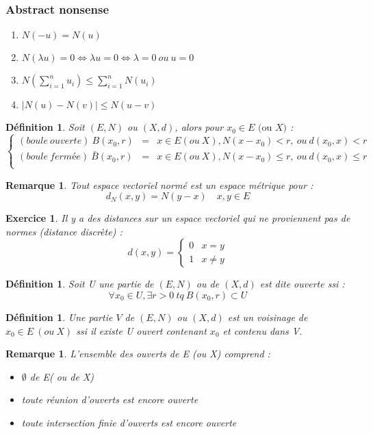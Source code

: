 \documentclass[a4paper, oneside]{report}
\theoremstyle{break}
\newtheorem{defi}[thm]{Définition}
\newtheorem{remar}[thm]{Remarque}
\newtheorem{exo}[thm]{Exercice}
\newcommand{\ev}{espace vectoriel }
\newcommand{\evn}{espace vectoriel normé }
\begin{document}
\subsubsection{Abstract nonsense}
\begin{enumerate}
\item $N(-u)=N(u)$
\item $N(\lambda u)=0 \Leftrightarrow \lambda u =0 \Leftrightarrow \lambda =0~ou~u=0$
\item $N(\sum_{i=1}^{n}u_i) \leq \sum_{i=1}^{n}N(u_i)$
\item $|N(u)-N(v)|\leq N(u-v)$
\end{enumerate}

\begin{defi}
Soit $(E,N)$ ou $(X,d)$, alors pour $x_0\in E \text{ (ou }X)$ :
$$\left\{\begin{array}{lll}
(boule~ouverte)~B(x_0,r)&=& x\in E(ou~X), N(x-x_0)<r,~ou~d(x_0,x)<r\\
(boule~fermée)~\bar{B}(x_0,r)&=&x\in E(ou~X), N(x-x_0)\leq r,~ou~d(x_0,x)\leq r\\
\end{array}\right.$$
\end{defi}

\begin{remar}
Tout \evn est un espace métrique pour :
$$d_N(x,y)=N(y-x)\hspace{1em}x,y\in E$$
\end{remar}

\begin{exo}
Il y a des distances sur un \ev qui ne proviennent pas de normes (distance discrète) :
$$d(x,y)=\left\{\begin{array}{ll}
0 & x=y\\
1 & x\neq y
\end{array}\right.$$
\end{exo}

\begin{defi}
Soit U une partie de $(E,N)$ ou de $(X, d)$ est dite ouverte ssi :
$$\forall x_0\in U, \exists r>0~tq~B(x_0,r)\subset U$$
\end{defi}

\begin{defi}        
Une partie $V$ de $(E,N)$ ou $(X, d)$ est un voisinage de $x_0\in E~(ou~X)$ ssi il existe U ouvert contenant $x_0$ et contenu dans V.
\end{defi}

\begin{remar}
L'ensemble des ouverts de E (ou X) comprend :
\begin{itemize}
\item $\emptyset$ de E( ou de X)
\item toute réunion d'ouverts est encore ouverte
\item toute intersection finie d'ouverts est encore ouverte
\end{itemize}
\end{remar}
\end{document}
